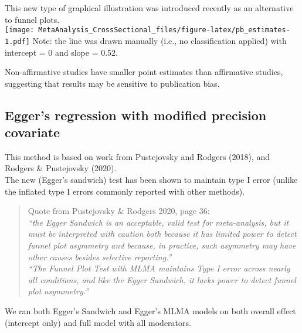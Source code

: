 \documentclass[
]{book}
\begin{document}
This new type of graphical illustration was introduced recently as an alternative to funnel plots.\\
\texttt{[image: MetaAnalysis\_CrossSectional\_files/figure-latex/pb\_estimates-1.pdf]}
Note: the line was drawn manually (i.e., no classification applied) with\\
intercept = 0 and slope = 0.52.

Non-affirmative studies have smaller point estimates than affirmative studies,
suggesting that results may be sensitive to publication bias.

\hypertarget{eggers-regression-with-modified-precision-covariate}{%
\subsection{Egger's regression with modified precision covariate}\label{eggers-regression-with-modified-precision-covariate}}

This method is based on work from Pustejovsky and Rodgers (2018), and Rodgers \& Pustejovsky (2020).\\
The new (Egger's sandwich) test has been shown to maintain type I error (unlike the inflated type I errors
commonly reported with other methods).

\begin{quote}
Quote from Pustejovsky \& Rodgers 2020, page 36:\\
\emph{``the Egger Sandwich is an acceptable, valid test for meta-analysis, but it must be interpreted
with caution both because it has limited power to detect funnel plot asymmetry
and because, in practice, such asymmetry may have other causes besides selective reporting.''}\\
\emph{``The Funnel Plot Test with MLMA maintains Type I error across nearly all conditions,
and like the Egger Sandwich, it lacks power to detect funnel plot asymmetry.''}
\end{quote}

We ran both Egger's Sandwich and Egger's MLMA models on both overall effect (intercept only)
and full model with all moderators.
\end{document}
